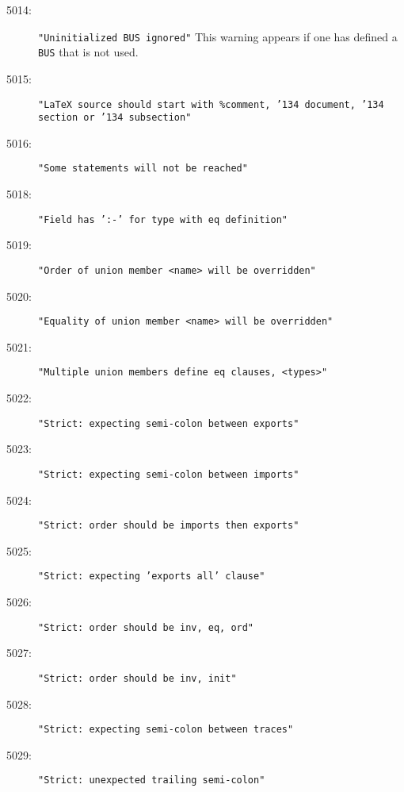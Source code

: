\begin{description}
\item[5014:] \texttt{"Uninitialized BUS ignored"}  This warning appears
  if one has defined a \texttt{BUS} that is not used.
\item[5015:] \texttt{"LaTeX source should start with \%comment,
  \char'134 document, \char'134 section or \char'134 subsection"  }
\item[5016:] \texttt{"Some statements will not be reached"}
\item[5018:] \texttt{"Field has ':-' for type with eq definition"}
\item[5019:] \texttt{"Order of union member <name> will be overridden"}
\item[5020:] \texttt{"Equality of union member <name> will be overridden"}
\item[5021:] \texttt{"Multiple union members define eq clauses, <types>"}
\item[5022:] \texttt{"Strict: expecting semi-colon between exports"}
\item[5023:] \texttt{"Strict: expecting semi-colon between imports"}
\item[5024:] \texttt{"Strict: order should be imports then exports"}
\item[5025:] \texttt{"Strict: expecting 'exports all' clause"}
\item[5026:] \texttt{"Strict: order should be inv, eq, ord"}
\item[5027:] \texttt{"Strict: order should be inv, init"}
\item[5028:] \texttt{"Strict: expecting semi-colon between traces"}
\item[5029:] \texttt{"Strict: unexpected trailing semi-colon"}

\end{description}
